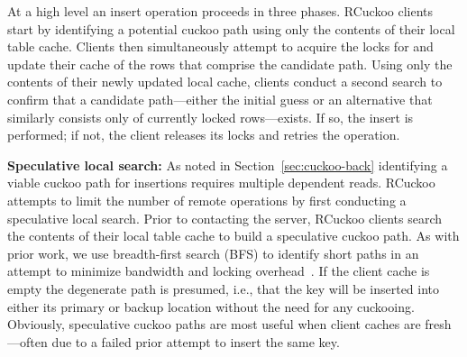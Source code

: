 
At a high level an insert operation proceeds in three phases.  RCuckoo
clients start by identifying a potential cuckoo path using only the
contents of their local table cache.  Clients then simultaneously
attempt to acquire the locks for and update their cache of the rows
that comprise the candidate path.  Using only the contents of their
newly updated local cache, clients conduct a second search to confirm
that a candidate path---either the initial guess or an alternative
that similarly consists only of currently locked rows---exists.  If
so, the insert is performed; if not, the client releases its locks and
retries the operation.

\textbf{Speculative local search:} As noted in
Section~\ref{sec:cuckoo-back} identifying a viable cuckoo path for
insertions requires multiple dependent reads.  RCuckoo attempts to
limit the number of remote operations by first conducting a
speculative local search. Prior to contacting the server, RCuckoo
clients search the contents of their local table cache to build a
speculative cuckoo path.  As with prior work, we use breadth-first
search (BFS) to identify short paths in an attempt to minimize
bandwidth and locking overhead~\cite{cuckoo-improvements}.  If the
client cache is empty the degenerate path is presumed, i.e., that the
key will be inserted into either its primary or backup location
without the need for any cuckooing.  Obviously, speculative cuckoo
paths are most useful when client caches are fresh---often due to a
failed prior attempt to insert the same key.

